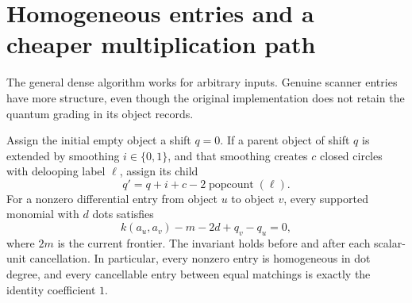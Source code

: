 \section{Homogeneous entries and a cheaper multiplication path}
\label{sec:homogeneous}

The general dense algorithm works for arbitrary inputs. Genuine scanner
entries have more structure, even though the original implementation does
not retain the quantum grading in its object records.

\begin{samepage}
\begin{proposition}
\label{prop:grading}
Assign the initial empty object a shift $q=0$. If a parent object of shift
$q$ is extended by smoothing $i\in\{0,1\}$, and that smoothing creates
$c$ closed circles with delooping label $\ell$, assign its child
\begin{equation}
 q'=q+i+c-2\operatorname{popcount}(\ell).
 \label{eq:qshadow}
\end{equation}
For a nonzero differential entry from object $u$ to object $v$, every
supported monomial with $d$ dots satisfies
\begin{equation}
 k(a_u,a_v)-m-2d+q_v-q_u=0,
 \label{eq:qdegree}
\end{equation}
where $2m$ is the current frontier. The invariant holds before and after
each scalar-unit cancellation. In particular, every nonzero entry is
homogeneous in dot degree, and every cancellable entry between equal
matchings is exactly the identity coefficient $1$.
\end{proposition}
\end{samepage}
